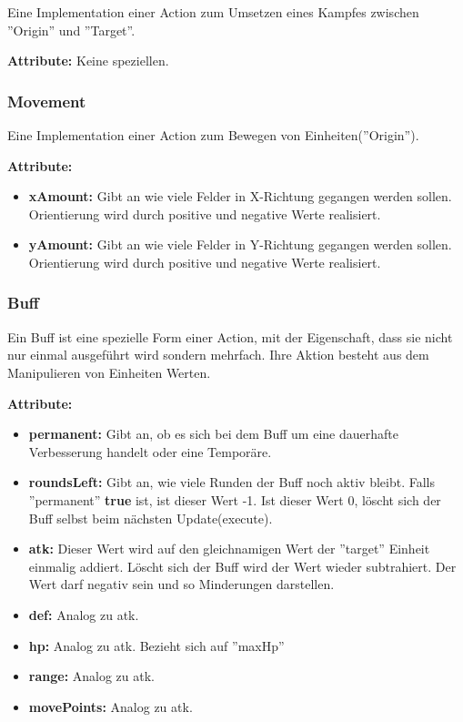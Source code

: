 \documentclass[fontsize=12pt,paper=a4,twoside]{scrartcl}
\begin{document}
Eine Implementation einer Action zum Umsetzen eines Kampfes zwischen ''Origin'' und ''Target''.

\textbf{Attribute:}
Keine speziellen.

\subsubsection{Movement}

Eine Implementation einer Action zum Bewegen von Einheiten(''Origin'').

\textbf{Attribute:}
\begin{itemize}
\item \textbf{xAmount:} Gibt an wie viele Felder in X-Richtung gegangen werden sollen. Orientierung wird durch positive und negative Werte realisiert.
\item \textbf{yAmount:} Gibt an wie viele Felder in Y-Richtung gegangen werden sollen. Orientierung wird durch positive und negative Werte realisiert.
\end{itemize}

\subsubsection{Buff}

Ein Buff ist eine spezielle Form einer Action, mit der Eigenschaft, dass sie nicht nur einmal ausgeführt wird sondern mehrfach. Ihre Aktion besteht aus dem Manipulieren von Einheiten Werten.

\textbf{Attribute:}
\begin{itemize}
\item \textbf{permanent:} Gibt an, ob es sich bei dem Buff um eine dauerhafte Verbesserung handelt oder eine Temporäre.
\item \textbf{roundsLeft:} Gibt an, wie viele Runden der Buff noch aktiv bleibt. Falls ''permanent'' \textbf{true} ist, ist dieser Wert -1. Ist dieser Wert 0, löscht sich der Buff selbst beim nächsten Update(execute).
\item \textbf{atk:} Dieser Wert wird auf den gleichnamigen Wert der ''target'' Einheit einmalig addiert. Löscht sich der Buff wird der Wert wieder subtrahiert. Der Wert darf negativ sein und so Minderungen darstellen.
\item \textbf{def:} Analog zu atk.
\item \textbf{hp:} Analog zu atk. Bezieht sich auf ''maxHp''
\item \textbf{range:} Analog zu atk.
\item \textbf{movePoints:} Analog zu atk.
\end{itemize}
\end{document}
